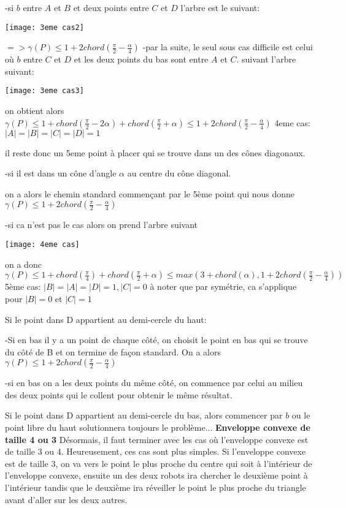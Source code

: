 -si $b$ entre $A$ et $B$ et deux points entre $C$ et $D$
l'arbre est le suivant:

\texttt{[image: 3eme cas2]}

$=> \gamma(P) \leq 1 + 2chord(\frac{\pi}{2} - \frac{\alpha}{4})$
-par la suite, le seul sous cas difficile est celui où $b$ entre $C$ et $D$ et les deux points du bas sont entre $A$ et $C$.
suivant l'arbre suivant:

\texttt{[image: 3eme cas3]}

on obtient alors
\(\gamma(P) \leq 1+chord(\frac{\pi}{2} - 2\alpha) + chord(\frac{\pi}{2} + \alpha) \leq 1 + 2chord(\frac{\pi}{2} - \frac{\alpha}{4})\)
\newline
\newline
4eme cas: $|A| = |B| = |C| = |D| = 1$

il reste donc un 5eme point à placer qui se trouve dans un des cônes diagonaux.

-si il est dans un cône d'angle $\alpha$ au centre du cône diagonal.

on a alors le chemin standard commençant par le 5ème point qui nous donne $\gamma(P) \leq 1 + 2chord(\frac{\pi}{2} - \frac{\alpha}{4})$

-si ca n'est pas le cas alors on prend l'arbre suivant

\texttt{[image: 4eme cas]}

on a donc $\gamma(P) \leq 1 + chord(\frac{\pi}{4}) + chord(\frac{\pi}{2} + \alpha) \leq max(3 + chord(\alpha), 1 + 2chord(\frac{\pi}{2} - \frac{\alpha}{4}))$
\newline
\newline
5ème cas: $|B| = |A| = |D| = 1, |C| = 0$
à noter que par symétrie, ca s'applique pour $|B| = 0$ et $|C| = 1$

Si le point dans D appartient au demi-cercle du haut:

-Si en bas il y a un point de chaque côté, on choisit le point en bas qui se trouve du côté de B et on termine de façon standard. On a alors $\gamma(P) \leq 1 + 2chord(\frac{\pi}{2} - \frac{\alpha}{4})$

-si en bas on a les deux points du même côté, on commence par celui au milieu des deux points qui le collent pour obtenir le même résultat.

Si le point dans D appartient au demi-cercle du bas, alors commencer par $b$ ou le point libre du haut solutionnera toujours le problème...
\newline
\newline
\textbf{\Large{Enveloppe convexe de taille 4 ou 3}}
\newline
\newline
Désormais, il faut terminer avec les cas où l'enveloppe convexe est de taille 3 ou 4. Heureusement, ces cas sont plus simples.
Si l'enveloppe convexe est de taille 3, on va vers le point le plus proche du centre qui soit à l'intérieur de l'enveloppe convexe, ensuite un des deux robots ira chercher le deuxième point à l'intérieur tandis que le deuxième ira réveiller le point le plus proche du triangle avant d'aller sur les deux autres.

